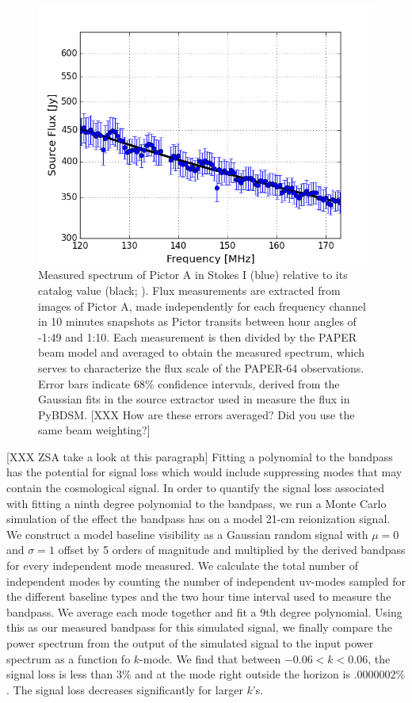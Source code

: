 \documentclass[twocolumn,numberedappendix]{emulateapj} \shorttitle{PSA64}
\begin{document}
\begin{figure}
\centering
\includegraphics[width=\columnwidth]{plots/picspec.png}
\caption{
Measured spectrum of Pictor A in Stokes I (blue) relative to its catalog
value (black; \citealt{jacobs_et_al2013}).  Flux measurements are
extracted from images of Pictor A, made independently for each frequency channel in
10 minutes snapshots as Pictor transits between hour angles of -1:49
and 1:10.  Each measurement is then divided by the PAPER beam model and
averaged to obtain the measured spectrum, which serves to characterize the flux
scale of the PAPER-64 observations. Error bars indicate 68\% confidence
intervals, derived from the Gaussian fits in the source extractor used in
measure the flux in PyBDSM.
[XXX How are these errors averaged? Did you use the same beam weighting?]
}\label{fig:pic_spec}
\end{figure}

[XXX ZSA take a look at this paragraph]
Fitting a polynomial to the bandpass has the potential for signal loss which
would include suppressing modes that may contain the cosmological signal. In order to
quantify the signal loss associated with fitting a ninth degree polynomial to
the bandpass, we run a Monte Carlo simulation of the effect the bandpass has on
a model 21-cm reionization signal. We construct a model baseline visibility as a Gaussian
random signal with $\mu=0$ and $\sigma=1$ offset by 5 orders of magnitude and 
multiplied by the derived bandpass for every independent mode measured.  We
calculate the total number of independent modes by counting the number of
independent uv-modes sampled for the different baseline types and the two hour
time interval used to measure the bandpass. We average each mode together and
fit a 9th degree polynomial. Using this as our measured bandpass for this
simulated signal, we finally compare the power spectrum from the output of the
simulated signal to the input power spectrum as a function fo $k$-mode.  We
find that between $-0.06 < k < 0.06$, the signal loss is less than $3\%$ and at
the mode right outside the horizon is $.0000002\%$. The signal loss decreases
significantly for larger $k$'s.
\end{document}
